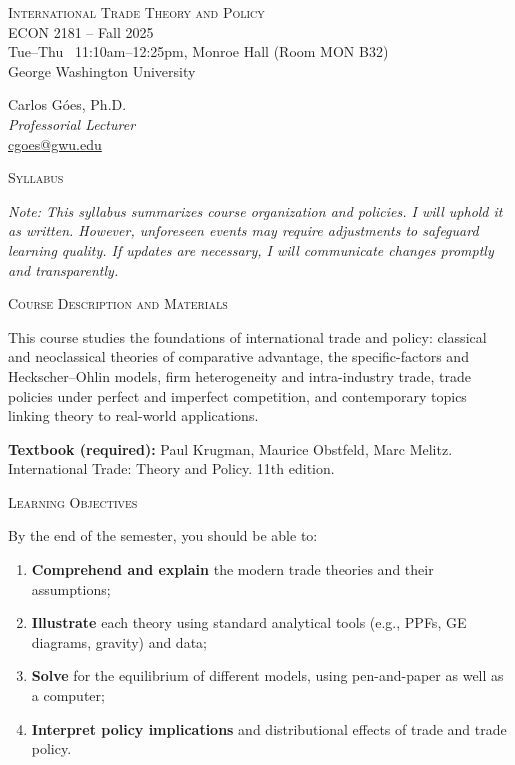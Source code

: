 \documentclass[11pt]{article}
\begin{document}
\begin{center}
\Large{\textsc{International Trade Theory and Policy}}\\[4pt]
\Large{ECON 2181 \;--\; Fall 2025}\\[6pt]
\LARGE{Tue--Thu \, 11:10am--12:25pm, Monroe Hall (Room MON B32)}\\[4pt]
\Large{George Washington University}
\end{center}

\medskip

\begin{center}
\large Carlos Góes, Ph.D. \\
\textit{Professorial Lecturer}\\
\href{mailto:cgoes@gwu.edu}{cgoes@gwu.edu} \\
\end{center}

\bigskip

\begin{center}
\Large{\textsc{Syllabus}}
\end{center}

\bigskip

\noindent \textit{Note: This syllabus summarizes course organization and policies. I will uphold it as written. However, unforeseen events may require adjustments to safeguard learning quality. If updates are necessary, I will communicate changes promptly and transparently.}

\bigskip

\noindent\textsc{Course Description and Materials}

\smallskip
This course studies the foundations of international trade and policy: classical and neoclassical theories of comparative advantage, the specific-factors and Heckscher–Ohlin models, firm heterogeneity and intra-industry trade, trade policies under perfect and imperfect competition, and contemporary topics linking theory to real-world applications. 

\medskip
\textbf{Textbook (required):} Paul Krugman,  Maurice Obstfeld, Marc Melitz. International Trade: Theory and Policy. 11th edition.

\bigskip

\noindent\textsc{Learning Objectives}

\smallskip
By the end of the semester, you should be able to:
\begin{enumerate}
    \item \textbf{Comprehend and explain} the modern trade theories and their assumptions;
    \item \textbf{Illustrate} each theory using standard analytical tools (e.g., PPFs, GE diagrams, gravity) and data;
    \item \textbf{Solve} for the equilibrium of different models, using pen-and-paper as well as a computer;
    \item \textbf{Interpret policy implications} and distributional effects of trade and trade policy.
\end{enumerate}
\end{document}
